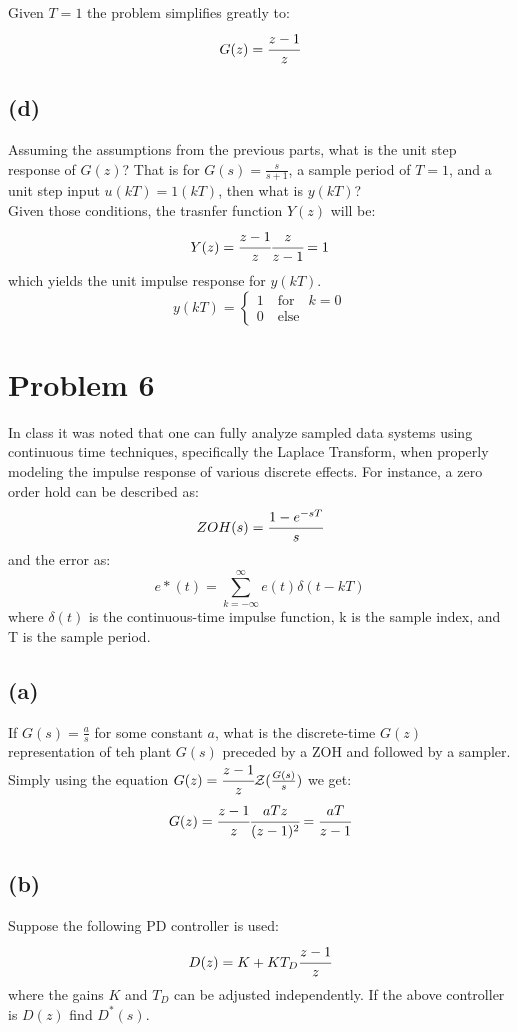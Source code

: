 \documentclass{article}
\begin{document}
Given $T=1$ the problem simplifies greatly to:
\[G(z)=\cfrac{z-1}{z}\]

\subsection*{(d)}
Assuming the assumptions from the previous parts, what is the unit step response of $G(z)$? That is for $G(s)=\frac{s}{s+1}$, a sample period of $T=1$, and a unit step input $u(kT)=1(kT)$, then what is $y(kT)$?\\

Given those conditions, the trasnfer function $Y(z)$ will be:
\[Y(z)=\cfrac{z-1}{z}\cfrac{z}{z-1}=1\]
which yields the unit impulse response for $y(kT)$.
\[y(kT)=\left \{\begin{array}{l}1\quad \text{for}\quad k=0\\0\quad  \text{else}\end{array}\right .\]

\section*{Problem 6}
In class it was noted that one can fully analyze sampled data systems using continuous time techniques, specifically the Laplace Transform, when properly modeling the impulse response of various discrete effects. For instance, a zero order hold can be described as:
\[ZOH(s)=\cfrac{1-e^{-sT}}{s}\]
and the error as:
\[e*(t)=\sum_{k=-\infty}^{\infty}e(t)\delta (t-kT)\]
where $\delta(t)$ is the continuous-time impulse function, k is the sample index, and T is the sample period.
\subsection*{(a)}
If $G(s)=\frac{a}{s}$ for some constant $a$, what is the discrete-time $G(z)$ representation of teh plant $G(s)$ preceded by a ZOH and followed by a sampler.\\

Simply using the equation $G(z)=\cfrac{z-1}{z}\mathcal{Z}(\frac{G(s)}{s})$ we get:
\[G(z)=\cfrac{z-1}{z}\cfrac{aTz}{(z-1)^2}=\cfrac{aT}{z-1}\]

\subsection*{(b)}
Suppose the following PD controller is used:
\[D(z)=K+KT_D\cfrac{z-1}{z}\]
where the gains $K$ and $T_D$ can be adjusted independently. If the above controller is $D(z)$ find $D^*(s)$.\\
\end{document}
